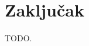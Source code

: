 \documentclass[times, utf8, seminar]{fit}
\begin{document}









\chapter{Zaključak}

TODO.



\end{document}
